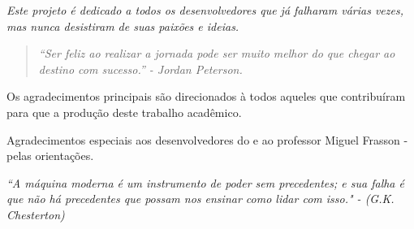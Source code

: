 \documentclass[
	12pt,				%
	openright,			%
	twoside,			%
	a4paper,			%
	english,			%
	brazil				%
	]{abntex2}
\begin{document}
\begin{dedicatoria}
	\vspace*{\fill}
	\centering
	\noindent
	\textit{Este projeto é dedicado a todos os desenvolvedores que já falharam várias vezes, mas nunca desistiram de suas paixões e ideias.}

	\begin{quote}
	\textit{``Ser feliz ao realizar a jornada pode ser muito melhor do que chegar ao destino com sucesso.'' - Jordan Peterson.}
	\end{quote}

	\vspace*{\fill}

\end{dedicatoria}

\begin{agradecimentos}
	Os agradecimentos principais são direcionados à todos aqueles que contribuíram para que a produção deste trabalho acadêmico.

	Agradecimentos especiais aos desenvolvedores do \abnTeX e ao professor Miguel Frasson - pelas orientações.

\end{agradecimentos}


\begin{epigrafe}
	\vspace*{\fill}
	\begin{flushright}
		\textit{``A máquina moderna é um instrumento de poder sem precedentes; e sua falha é que não há precedentes que possam nos ensinar como lidar com isso." - (G.K. Chesterton)}
	\end{flushright}
\end{epigrafe}

\end{document}
